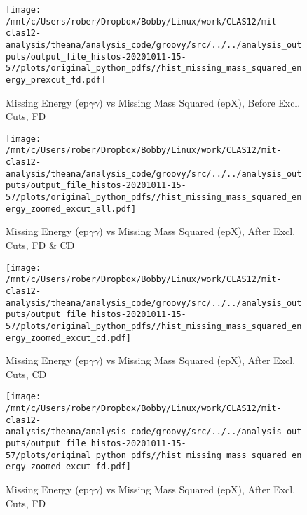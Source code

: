 \documentclass{article}
\begin{document}
\begin{landscape}
    \begin{figure}[h]
        \centering

        \texttt{[image: /mnt/c/Users/rober/Dropbox/Bobby/Linux/work/CLAS12/mit-clas12-analysis/theana/analysis\_code/groovy/src/../../analysis\_outputs/output\_file\_histos-20201011-15-57/plots/original\_python\_pdfs//hist\_missing\_mass\_squared\_energy\_prexcut\_fd.pdf]}
        \captionsetup{textformat=empty,labelformat=blank}
        \caption{Missing Energy (ep$\gamma$$\gamma$) vs Missing Mass Squared (epX), Before Excl. Cuts, FD}
    \end{figure}
    \clearpage
    
    \begin{figure}[h]
        \centering

        \texttt{[image: /mnt/c/Users/rober/Dropbox/Bobby/Linux/work/CLAS12/mit-clas12-analysis/theana/analysis\_code/groovy/src/../../analysis\_outputs/output\_file\_histos-20201011-15-57/plots/original\_python\_pdfs//hist\_missing\_mass\_squared\_energy\_zoomed\_excut\_all.pdf]}
        \captionsetup{textformat=empty,labelformat=blank}
        \caption{Missing Energy (ep$\gamma$$\gamma$) vs Missing Mass Squared (epX), After Excl. Cuts, FD \& CD}
    \end{figure}
    \clearpage
    
    \begin{figure}[h]
        \centering

        \texttt{[image: /mnt/c/Users/rober/Dropbox/Bobby/Linux/work/CLAS12/mit-clas12-analysis/theana/analysis\_code/groovy/src/../../analysis\_outputs/output\_file\_histos-20201011-15-57/plots/original\_python\_pdfs//hist\_missing\_mass\_squared\_energy\_zoomed\_excut\_cd.pdf]}
        \captionsetup{textformat=empty,labelformat=blank}
        \caption{Missing Energy (ep$\gamma$$\gamma$) vs Missing Mass Squared (epX), After Excl. Cuts, CD}
    \end{figure}
    \clearpage
    
    \begin{figure}[h]
        \centering

        \texttt{[image: /mnt/c/Users/rober/Dropbox/Bobby/Linux/work/CLAS12/mit-clas12-analysis/theana/analysis\_code/groovy/src/../../analysis\_outputs/output\_file\_histos-20201011-15-57/plots/original\_python\_pdfs//hist\_missing\_mass\_squared\_energy\_zoomed\_excut\_fd.pdf]}
        \captionsetup{textformat=empty,labelformat=blank}
        \caption{Missing Energy (ep$\gamma$$\gamma$) vs Missing Mass Squared (epX), After Excl. Cuts, FD}
    \end{figure}
    \clearpage
    

\end{landscape}
\end{document}
